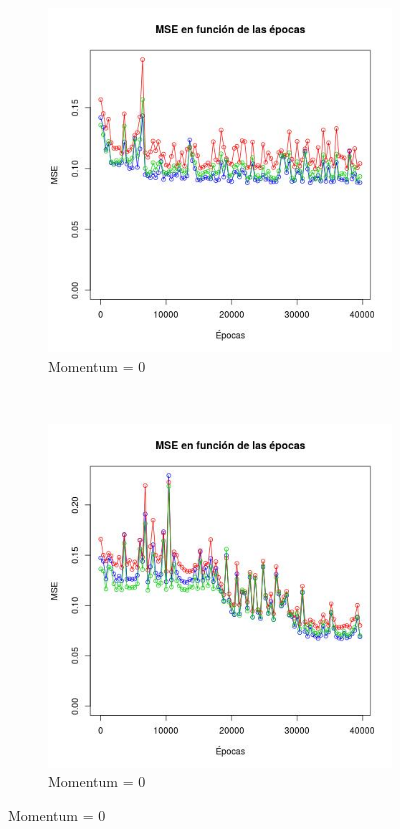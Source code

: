 \documentclass[12pt, a4paper]{article}
\begin{document}
\begin{figure}
    \centering

    \begin{subfigure}[b]{0.45\textwidth}
        \includegraphics[width=\textwidth]{mse11}
        \caption{Momentum = 0}
    \end{subfigure}
      ~ %
    \begin{subfigure}[b]{0.45\textwidth}
        \includegraphics[width=\textwidth]{mse11d}
        \caption{Momentum = 0}
    \end{subfigure}


\end{figure}
\end{document}
